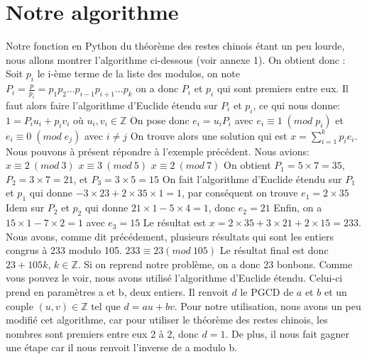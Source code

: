 \documentclass[a4paper, 11pt]{report}
\begin{document}
\newpage

\section{Notre algorithme}
Notre fonction en Python du théorème des restes chinois étant un peu lourde,
nous allons montrer l'algorithme ci-dessous (voir annexe 1).
On obtient donc :
\newline
Soit $p_i$ le i-ème terme de la liste des modulos, on note \newline
$ P_i=\frac{p}{p_i}=p_1 p_2 ... p_{i-1} p_{i+1} ... p_k $   \newline
on a donc $P_i$ et $p_i$  qui sont premiers entre eux. \newline
Il faut alors faire l'algorithme d'Euclide étendu sur $P_i$ et $p_i$, ce qui nous donne: 
$1= P_i u_i + p_i v_i$ 
où 
$u_i, v_i \in  \mathbb{Z}  $
\newline
On pose donc $e_i = u_i P_i$ avec $ e_i \equiv 1 \; (mod \; p_i)$ et $ e_i\equiv 0 \; (mod \; e_j)$ avec $ i\neq j$ \newline
On trouve alors une solution qui est $x=\sum_{i = 1}^{k}{p_i e_i} $.\newline
\newline
\newline
Nous pouvons à présent répondre à l'exemple précédent. Nous avions: \newline
$ x\equiv 2 \: (mod \:  3)$ 
\newline
$ x\equiv 3 \: (mod \: 5)$
\newline
$ x \equiv 2 \:(mod\: 7)$
\newline
On obtient $P_1=5\times 7=35$, $P_2=3\times 7=21 $, et $P_3=3\times 5=15$ \newline
On fait l'algorithme d'Euclide étendu sur $P_1$ et $p_1$ qui donne $-3\times 23 +2\times 35\times 1= 1 $, par conséquent on trouve $e_1=2\times 35$ \newline
Idem sur $P_2$ et $p_2$ qui donne $21\times 1 - 5\times 4=1$, donc $e_2=21$ \newline
Enfin, on a $15\times 1- 7\times 2 = 1 $ avec $e_3=15$ \newline
Le résultat est $x=2\times 35 + 3\times 21 + 2\times 15 =233$.
Nous avons, comme dit précédement, plusieurs résultats qui sont les entiers congrus à 233 modulo 105. \newline
$233\equiv 23 (mod \: 105)$ \newline
Le résultat final est donc $23+105k$, $k \in \mathbb{Z} $.
Si on reprend notre problème, on a donc 23 bonbons.
\newline
\newline
Comme vous pouvez le voir, nous avons utilisé l'algorithme d'Euclide étendu. Celui-ci prend en paramètres a et b, deux entiers.
Il renvoit $d$ le PGCD de $a$ et $b$ et un couple $(u,v) \in \mathbb{Z} $ tel que $d=au+bv$.
\newline
Pour notre utilisation, nous avons un peu modifié cet algorithme, car pour utiliser le théorème des restes chinois, les nombres sont premiers entre eux 2 à 2,
donc $d=1$. De plus, il nous fait gagner une étape car il nous renvoit l'inverse de a modulo b.
\end{document}
